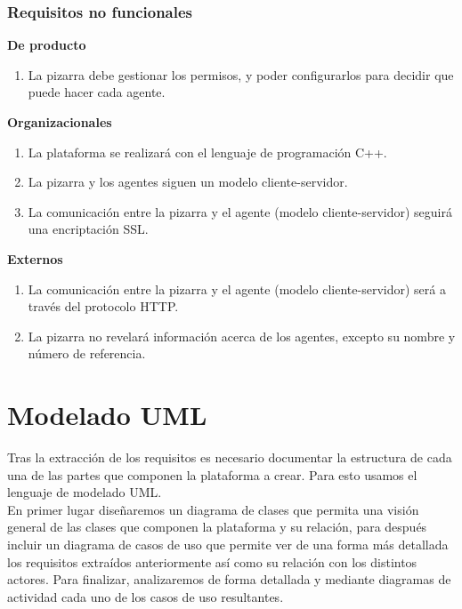 \subsubsection{Requisitos no funcionales}
\textbf{De producto}
	\begin{enumerate}
		\item La pizarra debe gestionar los permisos, y poder configurarlos para decidir que puede hacer cada agente.
	\end{enumerate}
\textbf{Organizacionales}
	\begin{enumerate}
		\item La plataforma se realizará con el lenguaje de programación C++.
		\item La pizarra y los agentes siguen un modelo cliente-servidor.
		\item La comunicación entre la pizarra y el agente (modelo cliente-servidor) seguirá una encriptación SSL.
	\end{enumerate}
\textbf{Externos}
	\begin{enumerate}
		\item La comunicación entre la pizarra y el agente (modelo cliente-servidor) será a través del protocolo HTTP.
		\item La pizarra no revelará información acerca de los agentes, excepto su nombre y número de referencia.
	\end{enumerate}
	
\section{Modelado UML}
Tras la extracción de los requisitos es necesario documentar la estructura de cada una de las partes que componen la plataforma a crear. Para esto usamos el lenguaje de modelado UML.\\

En primer lugar diseñaremos un diagrama de clases que permita una visión general de las clases que componen la plataforma y su relación, para después incluir un diagrama de casos de uso que permite ver de una forma más detallada los requisitos extraídos anteriormente así como su relación con los distintos actores. Para finalizar, analizaremos de forma detallada y mediante diagramas de actividad cada uno de los casos de uso resultantes.\\

